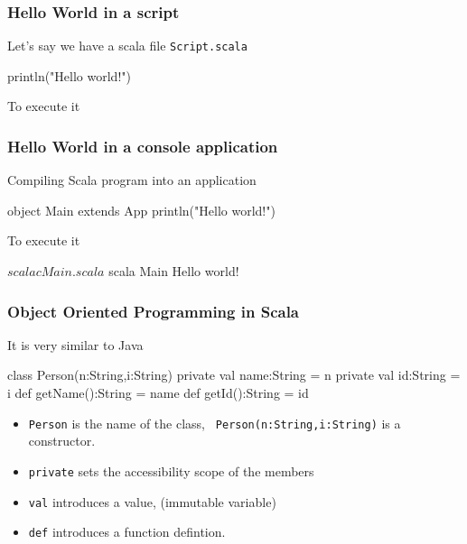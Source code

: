 \documentclass{beamer}
\begin{document}
\begin{frame}[fragile]
\frametitle{Hello World in a script}
Let's say we have a scala file {\tt Script.scala}
\begin{code}
println("Hello world!")
\end{code}
To execute it
\end{frame}

\begin{frame}[fragile]
\frametitle{Hello World in a console application}
Compiling Scala program into an application
\begin{code}
object Main extends App 
{
    println("Hello world!")
}
\end{code}
To execute it
\begin{code}
$ scalac Main.scala
$ scala Main
Hello world!
\end{code}
\end{frame}

\begin{frame}[fragile]
\frametitle{Object Oriented Programming in Scala}
It is very similar to Java
\begin{code}
class Person(n:String,i:String) {
   private val name:String = n
   private val id:String   = i
   def getName():String = name
   def getId():String = id
}
\end{code}
\begin{itemize}
 \item {\tt Person} is the name of the class, {\tt
     Person(n:String,i:String)} is a constructor.
 \item {\tt private} sets the accessibility scope of the members
 \item {\tt val} introduces a value, (immutable variable)
 \item {\tt def} introduces a function defintion.
\end{itemize}
\end{frame}
\end{document}
